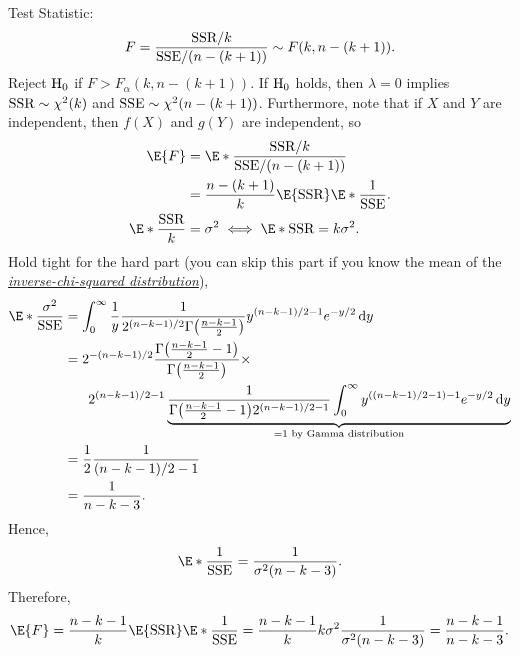 Test Statistic:
\[ F=\frac{\text{SSR}/k}{\text{SSE}/(n-(k+1))}\sim F(k,n-(k+1)). \]
Reject $ \text{H}_0 $ if $ F>F_{\alpha}(k,n-(k+1)) $. If $ \text{H}_0 $ holds, then $ \lambda=0 $ implies
$ \text{SSR} \sim \chi^2(k) $ and $ \text{SSE} \sim \chi^2(n-(k+1)) $. Furthermore, note that
if $ X $ and $ Y $ are independent, then $ f(X) $ and $ g(Y) $ are independent, so
\begin{align*}
    \E{F}
                        & =\E*{\frac{\SSR/k}{\SSE/(n-(k+1))}}            \\
                        & =\frac{n-(k+1)}{k}\E{\SSR}\E*{\frac{1}{\SSE}}. \\
    \E*{\frac{\SSR}{k}} & =\sigma^2\iff \E*{\SSR}=k\sigma^2.
\end{align*}
Hold tight for the hard part (you can skip this part if you know the mean of the
\href{https://en.wikipedia.org/wiki/Inverse-chi-squared_distribution}{\emph{inverse-chi-squared distribution}}),
\begin{align*}
    \E*{\frac{\sigma^2}{\SSE}}
     & =\int_{0}^{\infty}\frac{1}{y}\frac{1}{2^{(n-k-1)/2}\Gamma\bigl(\frac{n-k-1}{2}\bigr)}
    y^{(n-k-1)/2-1}e^{-y/2}\odif{y}                                                                              \\
     & =2^{-(n-k-1)/2}\frac{\Gamma\bigl(\frac{n-k-1}{2}-1\bigr)}{\Gamma\bigl(\frac{n-k-1}{2}\bigr)}\times        \\
     & \phantom{=}\quad 2^{(n-k-1)/2-1} \underbrace{\frac{1}{\Gamma\bigl(\frac{n-k-1}{2}-1\bigr)2^{(n-k-1)/2-1}}
    \int_{0}^{\infty}y^{((n-k-1)/2-1)-1}e^{-y/2}\odif{y}}_{=1\text{ by Gamma distribution}}                      \\
     & =\frac{1}{2}\frac{1}{(n-k-1)/2-1}                                                                         \\
     & =\frac{1}{n-k-3}.
\end{align*}
Hence,
\[ \E*{\frac{1}{\SSE}}=\frac{1}{\sigma^2(n-k-3)}. \]
Therefore,
\[ \E{F}=\frac{n-k-1}{k}\E{\SSR}\E*{\frac{1}{\SSE}}=
    \frac{n-k-1}{k}k\sigma^2\frac{1}{\sigma^2(n-k-3)}=\frac{n-k-1}{n-k-3}. \]